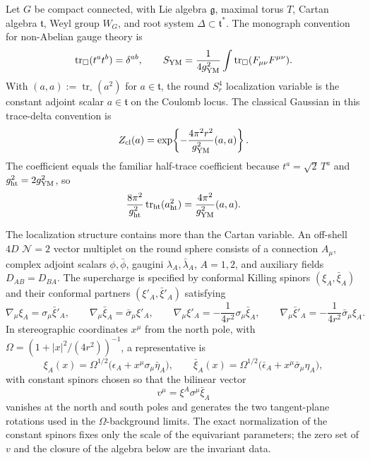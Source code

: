 Let \(G\) be compact connected, with Lie algebra \(\mathfrak g\), maximal
torus \(T\), Cartan algebra \(\mathfrak t\), Weyl group \(W_G\), and root
system \(\Delta\subset\mathfrak t^\ast\).  The monograph convention for
non-Abelian gauge theory is
\[
  \operatorname{tr}_{\square}(t^at^b)=\delta^{ab},
  \qquad
  S_{\rm YM}=\frac1{4g_{\rm YM}^2}
  \int \operatorname{tr}_{\square}(F_{\mu\nu}F^{\mu\nu}) .
\]
With \((a,a):=\operatorname{tr}_{\square}(a^2)\) for \(a\in\mathfrak t\), the
round \(S^4_r\) localization variable is the constant adjoint scalar
\(a\in\mathfrak t\) on the Coulomb locus.  The classical Gaussian in this
trace-delta convention is
\begin{equation}
  Z_{\rm cl}(a)
  =
  \exp\!\left\{
    -\frac{4\pi^2r^2}{g_{\rm YM}^2}(a,a)
  \right\}.
  \label{eq:s4-localization-classical-gaussian}
\end{equation}
The coefficient equals the familiar half-trace coefficient because
\(t^a=\sqrt2\,T^a\) and \(g_{\rm ht}^2=2g_{\rm YM}^2\), so
\[
  \frac{8\pi^2}{g_{\rm ht}^2}\operatorname{tr}_{\rm ht}(a_{\rm ht}^2)
  =
  \frac{4\pi^2}{g_{\rm YM}^2}(a,a).
\]

The localization structure contains more than the Cartan variable.  An off-shell
\(4D\) \(\mathcal N=2\) vector multiplet on the round sphere consists of a
connection \(A_\mu\), complex adjoint scalars \(\phi,\bar\phi\), gaugini
\(\lambda_A,\bar\lambda_A\), \(A=1,2\), and auxiliary fields
\(D_{AB}=D_{BA}\).  The supercharge is specified by conformal Killing spinors
\((\xi_A,\bar\xi_A)\) and their conformal partners
\((\xi'_A,\bar\xi'_A)\) satisfying
\begin{equation}
  \nabla_\mu\xi_A=\sigma_\mu\bar\xi'_A,\qquad
  \nabla_\mu\bar\xi_A=\bar\sigma_\mu\xi'_A,\qquad
  \nabla_\mu\xi'_A=-\frac1{4r^2}\sigma_\mu\bar\xi_A,\qquad
  \nabla_\mu\bar\xi'_A=-\frac1{4r^2}\bar\sigma_\mu\xi_A .
  \label{eq:s4-conformal-killing-spinor-system}
\end{equation}
In stereographic coordinates \(x^\mu\) from the north pole, with
\(\Omega=(1+|x|^2/(4r^2))^{-1}\), a representative is
\begin{equation}
  \xi_A(x)=\Omega^{1/2}\bigl(\epsilon_A+x^\mu\sigma_\mu\bar\eta_A\bigr),
  \qquad
  \bar\xi_A(x)=\Omega^{1/2}\bigl(\bar\epsilon_A+x^\mu\bar\sigma_\mu\eta_A\bigr),
  \label{eq:s4-cks-stereographic-representative}
\end{equation}
with constant spinors chosen so that the bilinear vector
\[
  v^\mu=\xi^A\sigma^\mu\bar\xi_A
\]
vanishes at the north and south poles and generates the two tangent-plane
rotations used in the \(\Omega\)-background limits.  The exact normalization of
the constant spinors fixes only the scale of the equivariant parameters; the
zero set of \(v\) and the closure of the algebra below are the invariant data.

